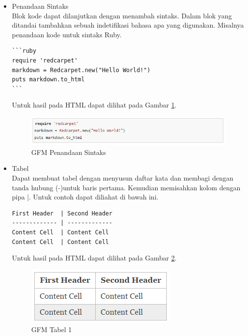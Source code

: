 \begin{itemize}
\begin{itemize}
\begin{itemize}
\item Penandaan Sintaks\\
Blok kode dapat dilanjutkan dengan menambah sintaks. Dalam blok yang ditandai
tambahkan sebuah indetifikasi bahasa apa yang digunakan. Misalnya penandaan kode
untuk sintaks Ruby.
\begin{lstlisting}[basicstyle=\footnotesize]
```ruby
require 'redcarpet'
markdown = Redcarpet.new("Hello World!")
puts markdown.to_html
```
\end{lstlisting}
Untuk hasil pada HTML dapat dilihat pada Gambar \ref{fig:ruby}.
\begin{figure}[H]
\centering
\includegraphics[scale=0.6]{Gambar/ruby.png}
\caption[GFM Penandaan Sintaks]{GFM Penandaan Sintaks}
\label{fig:ruby}
\end{figure}

\item Tabel\\
Dapat membuat tabel dengan menyusun daftar kata dan membagi dengan tanda hubung
(-)untuk baris pertama. Kemudian memisahkan kolom dengan pipa |. Untuk contoh
dapat diliahat di bawah ini.
\begin{lstlisting}[basicstyle=\footnotesize]
First Header  | Second Header
------------- | -------------
Content Cell  | Content Cell
Content Cell  | Content Cell
\end{lstlisting}
Untuk hasil pada HTML dapat dilihat pada Gambar \ref{fig:t1}.
\begin{figure}[H]
\centering
\includegraphics[scale=1]{Gambar/t1.png}
\caption[GFM Tabel 1]{GFM Tabel 1}
\label{fig:t1}
\end{figure}


\end{itemize}
\end{itemize}
\end{itemize}
